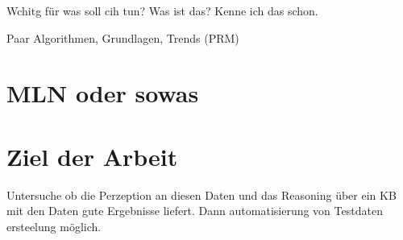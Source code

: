 Wchitg für was soll cih tun? Was ist das? Kenne ich das schon.

Paar Algorithmen, Grundlagen, Trends (PRM) 

\section{MLN oder sowas}

\section{Ziel der Arbeit}
\label{sec:goal}


Untersuche ob die Perzeption an diesen Daten und das Reasoning über ein KB mit den Daten gute Ergebnisse liefert. Dann automatisierung von Testdaten ersteelung möglich. 